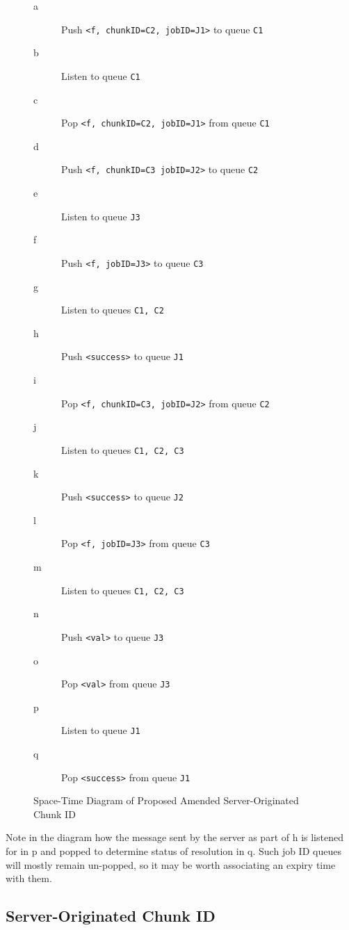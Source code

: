 \documentclass[a4paper,10pt]{article}
\begin{document}
\begin{figure}
	\setlength{\columnsep}{50pt}
	\begin{multicols}{2}
		\begin{description}
			\item [\textcolor{dark2-1}{a}] Push \texttt{<f, chunkID=C2, jobID=J1>} to queue \texttt{C1}
			\item [\textcolor{mygray}{b}] Listen to queue \texttt{C1}
			\item [\textcolor{dark2-1}{c}] Pop \texttt{<f, chunkID=C2, jobID=J1>} from queue \texttt{C1}
			\item [\textcolor{dark2-3}{d}] Push \texttt{<f, chunkID=C3 jobID=J2>} to queue \texttt{C2}
			\item [\textcolor{dark2-5}{e}] Listen to queue \texttt{J3}
			\item [\textcolor{dark2-5}{f}] Push \texttt{<f, jobID=J3>} to queue \texttt{C3}
			\item [\textcolor{mygray}{g}] Listen to queues \texttt{C1, C2}
			\item [\textcolor{dark2-1}{h}] Push \texttt{<success>} to queue \texttt{J1}
			\item [\textcolor{dark2-3}{i}] Pop \texttt{<f, chunkID=C3, jobID=J2>} from queue \texttt{C2}
			\item [\textcolor{mygray}{j}] Listen to queues \texttt{C1, C2, C3}
			\item [\textcolor{dark2-3}{k}] Push \texttt{<success>} to queue \texttt{J2}
			\item [\textcolor{dark2-5}{l}] Pop \texttt{<f, jobID=J3>} from queue \texttt{C3}
			\item [\textcolor{mygray}{m}] Listen to queues \texttt{C1, C2, C3}
			\item [\textcolor{dark2-5}{n}] Push \texttt{<val>} to queue \texttt{J3}
			\item [\textcolor{dark2-5}{o}] Pop \texttt{<val>} from queue \texttt{J3}
			\item [\textcolor{dark2-6}{p}] Listen to queue \texttt{J1}
			\item [\textcolor{dark2-6}{q}] Pop \texttt{<success>} from queue \texttt{J1}
		\end{description}
	\end{multicols}
	\caption{\label{fig:masi} Space-Time Diagram of Proposed Amended Server-Originated Chunk ID}
\end{figure}

Note in the diagram how the message sent by the server as part of
\textcolor{dark2-1}{h} is listened for in \textcolor{dark2-6}{p} and popped to
determine status of resolution in \textcolor{dark2-6}{q}.
Such job ID queues will mostly remain un-popped, so it may be worth associating
an expiry time with them.

\subsection{Server-Originated Chunk ID}
\printbibliography
\end{document}
